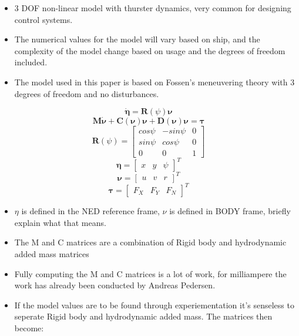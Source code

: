 \begin{itemize}
    \item 3 \gls{DOF} non-linear model with thurster dynamics, very common for designing control systems.
    \item The numerical values for the model will vary based on ship, and the complexity of the model change based on usage and the degrees of freedom included.
    \item The model used in this paper is based on Fossen's meneuvering theory with 3 degrees of freedom and no disturbances.
\end{itemize}

\begin{equation}
    \bm{\dot{\eta}} = \textbf{R}(\psi)\bm{\nu}    
\end{equation}
\begin{equation}
    \textbf{M}\bm{\dot{\nu}} + \textbf{C}(\bm{\nu})\bm{\nu} + \textbf{D}(\bm{\nu})\bm{\nu} = \bm{\tau}
\end{equation}
\begin{equation}
    \textbf{R}(\psi) = \begin{bmatrix}
                        cos\psi &   -sin\psi & 0\\[-5pt]
                        sin\psi & cos\psi    & 0\\[-5pt]
                        0       &   0        & 1
                        \end{bmatrix}
\end{equation}
\begin{equation}
    \bm{\eta} = \begin{bmatrix}
                x   &    y  &    \psi
                \end{bmatrix}^T
\end{equation}
\begin{equation}
    \bm{\nu} = \begin{bmatrix}
                 u   &   v  &    r
                \end{bmatrix}^T
\end{equation}
\begin{equation}
    \bm{\tau} = \begin{bmatrix}
                F_{X}   &   F_{Y}  &   F_{N}
                \end{bmatrix}^T
\end{equation}

\begin{itemize}
    \item $\eta$ is defined in the \gls{NED} reference frame, $\nu$ is defined in BODY frame, briefly explain what that means.
    \item The M and C matrices are a combination of Rigid body and hydrodynamic added mass matrices
    \item Fully computing the M and C matrices is a lot of work, for milliampere the work has already been conducted
    by Andreas Pedersen.
    \item If the model values are to be found through experiementation it's senseless to seperate Rigid body and hydrodynamic added mass.
    The matrices then become:
\end{itemize}

